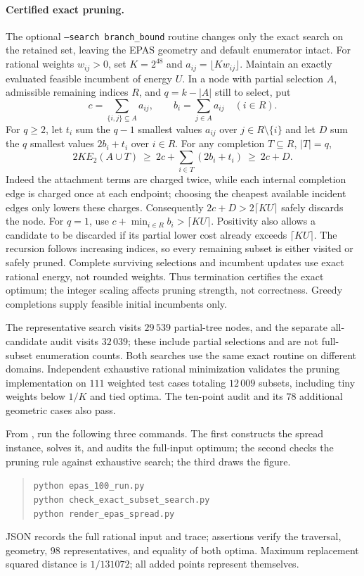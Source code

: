 \documentclass[a4paper,12pt]{article}
\numberwithin{equation}{section}
\begin{document}
\paragraph{Certified exact pruning.}
The optional \texttt{--search branch\_bound} routine changes only the exact search on the retained
set, leaving the EPAS geometry and default enumerator intact. For rational weights $w_{ij}>0$, set
$K=2^{48}$ and $a_{ij}=\lfloor K w_{ij}\rfloor$. Maintain an exactly evaluated feasible incumbent
of energy $U$. In a node with partial selection $A$, admissible remaining indices $R$, and
$q=k-|A|$ still to select, put
\[
 c=\sum_{\{i,j\}\subseteq A}a_{ij},\qquad
 b_i=\sum_{j\in A}a_{ij}\quad(i\in R).
\]
For $q\ge2$, let $t_i$ sum the $q-1$ smallest values $a_{ij}$ over $j\in R\setminus\{i\}$ and let
$D$ sum the $q$ smallest values $2b_i+t_i$ over $i\in R$. For any completion $T\subseteq R$,
$|T|=q$,
\[
 2K E_2(A\cup T)\ \ge\ 2c+\sum_{i\in T}(2b_i+t_i)
 \ \ge\ 2c+D.
\]
Indeed the attachment terms are charged twice, while each internal completion edge is charged once
at each endpoint; choosing the cheapest available incident edges only lowers these charges.
Consequently $2c+D>2\lceil KU\rceil$ safely discards the node. For $q=1$, use $c+\min_{i\in
R}b_i>\lceil KU\rceil$. Positivity also allows a candidate to be discarded if its partial lower
cost already exceeds $\lceil KU\rceil$. The recursion follows increasing indices, so every
remaining subset is either visited or safely pruned. Complete surviving selections and incumbent
updates use exact rational energy, not rounded weights. Thus termination certifies the exact
optimum; the integer scaling affects pruning strength, not correctness. Greedy completions supply
feasible initial incumbents only.

The representative search visits $29\,539$ partial-tree nodes, and the separate all-candidate
audit visits $32\,039$; these include partial selections and are not full-subset enumeration
counts. Both searches use the same exact routine on different domains. Independent exhaustive
rational minimization validates the pruning implementation on $111$ weighted test cases totaling
$12\,009$ subsets, including tiny weights below $1/K$ and tied optima. The ten-point audit and its
$78$ additional geometric cases also pass.

From , run the following three commands. The first
constructs the spread instance, solves it, and audits the full-input optimum;
the second checks the pruning rule against exhaustive search; the third draws the figure.
\begin{quote}
\verb|python epas_100_run.py|\\
\verb|python check_exact_subset_search.py|\\
\verb|python render_epas_spread.py|
\end{quote}
JSON records the full rational input and trace; assertions verify the traversal, geometry, $98$
representatives, and equality of both optima. Maximum replacement squared distance is $1/131072$;
all added points represent themselves.
\end{document}
